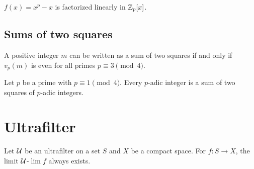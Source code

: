 \documentclass{article}
\let\realsection\section
\renewcommand\section{\newpage\realsection}
\begin{document}
\begin{ex}
$f(x)=x^p-x$ is factorized linearly in $\mathbb{Z}_p[x]$.
\end{ex}

\subsection{Sums of two squares}


\begin{thm}[Euler]
A positive integer $m$ can be written as a sum of two squares if and only if $v_p(m)$ is even for all primes $p\equiv3\pmod4$.
\end{thm}
\begin{lem}
Let $p$ be a prime with $p\equiv1\pmod4$.
Every $p$-adic integer is a sum of two squares of $p$-adic integers.
\end{lem}











\section{Ultrafilter}

\begin{thm}
Let $\mathcal{U}$ be an ultrafilter on a set $S$ and $X$ be a compact space.
For $f\colon S\to X$, the limit $\mathcal{U}$-$\lim f$ always exists.
\end{thm}
\end{document}
